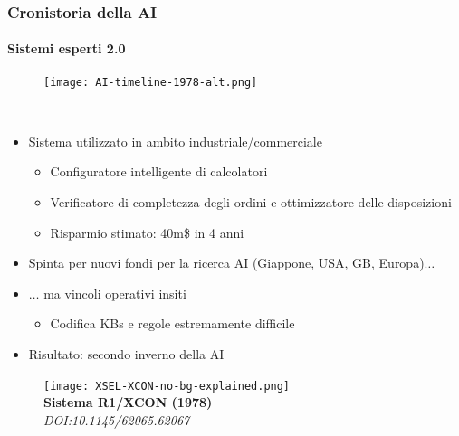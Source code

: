 %
\begin{frame}[t,fragile] \frametitle{Cronistoria della AI}
{\scriptsize
{}
\framesubtitle{Sistemi esperti 2.0}
\vspace*{-.5cm}
	\begin{minipage}[t]{\textwidth}
		\begin{figure}[ht]
			\centering
			\texttt{[image: AI-timeline-1978-alt.png]}
		\end{figure}
	\end{minipage}
	\\\vspace*{.3cm}
	\begin{minipage}[t]{\textwidth}
		\begin{minipage}[t]{0.6\textwidth}
			\begin{itemize}[leftmargin=10pt,align=right]
				\onslide<2->\item[\alert{\faHandORight}] Sistema utilizzato in ambito \alert{industriale/commerciale}
				\begin{itemize}[leftmargin=10pt,align=right]
					\onslide<3->\item[\alert{\faHandORight}] Configuratore intelligente di calcolatori
					\item[\alert{\faHandORight}] Verificatore di completezza degli ordini e ottimizzatore delle disposizioni
					\item[\alert{\faHandORight}] Risparmio stimato: 40m\$ in 4 anni
				\end{itemize}
				\item[\alert{\faHandORight}] Spinta per nuovi fondi per la ricerca AI (Giappone, USA, GB, Europa)$\ldots$
				\onslide<5->\item[\alert{\faHandORight}]$\ldots$ ma vincoli operativi insiti
				\begin{itemize}[leftmargin=10pt,align=right]
					\item[\alert{\faHandORight}] Codifica KBs e regole estremamente difficile
				\end{itemize}
				\item[\alert{\faHandORight}] Risultato: \alert{secondo inverno della AI}
			\end{itemize}
		\end{minipage}
		\begin{minipage}[t]{0.4\textwidth}
			\centering
			\begin{figure}[ht]
				\texttt{[image: XSEL-XCON-no-bg-explained.png]}
				{\tiny\\\textbf{Sistema R1/XCON (1978)}\\\textit{\textcopyright DOI:10.1145/62065.62067}}
			\end{figure}
		\end{minipage}
	\end{minipage}
}
\end{frame}

